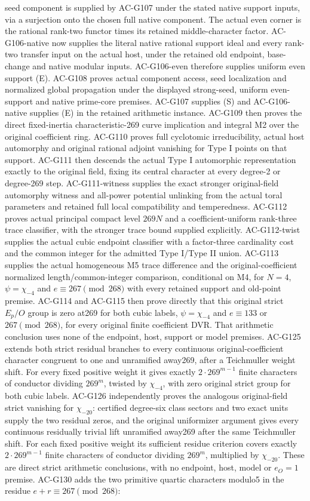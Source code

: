 \documentclass[11pt,a4paper]{article}
\theoremstyle{definition}
\theoremstyle{remark}
\begin{document}
seed component is supplied by AC-G107 under the stated native support
inputs, via a surjection onto the chosen full native component. The
actual even corner is the rational rank-two functor times its retained middle-character factor. AC-G106-native now supplies the literal native rational support ideal and every rank-two transfer input on the actual host, under the retained old endpoint, base-change and native modular inputs. AC-G106-even therefore supplies uniform even support (E).
AC-G108 proves actual component access, seed localization
and normalized global propagation under the displayed strong-seed,
uniform even-support and native prime-core premises. AC-G107 supplies (S) and AC-G106-native supplies (E) in the retained arithmetic instance. AC-G109 then proves the direct fixed-inertia characteristic-269 curve implication and integral M2 over the original coefficient ring. AC-G110 proves full cyclotomic irreducibility, actual host automorphy and original rational adjoint vanishing for Type I points on that support. AC-G111 then descends the actual Type I automorphic representation exactly to the original field, fixing its central character at every degree-2 or degree-269 step. AC-G111-witness supplies the exact stronger original-field automorphy witness and all-power potential unlinking from the actual toral parameters and retained full local compatibility and temperedness. AC-G112 proves actual principal compact level $269N$ and a coefficient-uniform rank-three trace classifier, with the stronger trace bound supplied explicitly. AC-G112-twist supplies the actual cubic endpoint classifier with a factor-three cardinality cost and the common integer for the admitted Type I/Type II union. AC-G113 supplies the actual homogeneous M5 trace difference and the original-coefficient normalized length/common-integer comparison, conditional on M4, for $N=4$, $\psi=\chi_{-4}$ and $e\equiv267\pmod{268}$ with every retained support and old-point premise. AC-G114 and AC-G115 then prove directly that this original strict $E_p/O$ group is zero at269 for both cubic labels, $\psi=\chi_{-4}$ and $e\equiv133$ or $267\pmod{268}$, for every original finite coefficient DVR. That arithmetic conclusion uses none of the endpoint, host, support or model premises. AC-G125 extends both strict residual branches to every continuous original-coefficient character congruent to one and unramified away269, after a Teichmuller weight shift. For every fixed positive weight it gives exactly $2\cdot269^{m-1}$ finite characters of conductor dividing $269^m$, twisted by $\chi_{-4}$, with zero original strict group for both cubic labels. AC-G126 independently proves the analogous original-field strict vanishing for $\chi_{-20}$: certified degree-six class sectors and two exact units supply the two residual zeros, and the original uniformizer argument gives every continuous residually trivial lift unramified away269 after the same Teichmuller shift. For each fixed positive weight its sufficient residue criterion covers exactly $2\cdot269^{m-1}$ finite characters of conductor dividing $269^m$, multiplied by $\chi_{-20}$. These are direct strict arithmetic conclusions, with no endpoint, host, model or $e_O=1$ premise. AC-G130 adds the two primitive quartic characters modulo5 in the residue $e+r\equiv267\pmod{268}$: 
\end{document}
